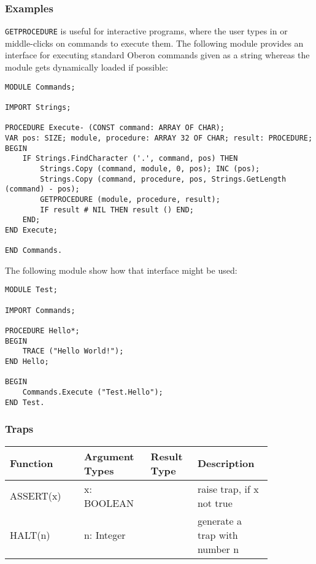 \documentclass[a4wide,11pt]{article}
\begin{document}
\begin{annotation}
\subsubsection{Examples}
\texttt{GETPROCEDURE} is useful for interactive programs, where the user types in or middle-clicks on commands to execute them. The following module provides an interface for executing standard Oberon commands given as a string whereas the module gets dynamically loaded if possible:
\begin{lstlisting}[style=example]
MODULE Commands;

IMPORT Strings;

PROCEDURE Execute- (CONST command: ARRAY OF CHAR);
VAR pos: SIZE; module, procedure: ARRAY 32 OF CHAR; result: PROCEDURE;
BEGIN
    IF Strings.FindCharacter ('.', command, pos) THEN
        Strings.Copy (command, module, 0, pos); INC (pos);
        Strings.Copy (command, procedure, pos, Strings.GetLength (command) - pos);
        GETPROCEDURE (module, procedure, result);
        IF result # NIL THEN result () END;
    END;
END Execute;

END Commands.
\end{lstlisting}

The following module show how that interface might be used:
\begin{lstlisting}[style=example]
MODULE Test;

IMPORT Commands;

PROCEDURE Hello*;
BEGIN
    TRACE ("Hello World!");
END Hello;

BEGIN
    Commands.Execute ("Test.Hello");
END Test.
\end{lstlisting}
\end{annotation}

\subsubsection{Traps}
\begin{longtable}{|p{0.25\linewidth}|p{0.2\linewidth}|p{0.15\linewidth}|p{0.25\linewidth}|}
\hline
Function & Argument Types & Result Type & Description \\
\hline\hline
\endhead
ASSERT(x) & x: BOOLEAN & & raise trap, if x not true \\
HALT(n) & n: Integer & & generate a trap with number n \\
\hline
\end{longtable}
\end{document}
